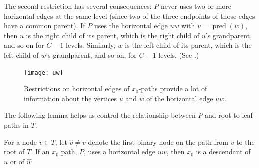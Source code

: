 \documentclass{patmorin}
\DeclareMathOperator{\pred}{pred}
\begin{document}
The second restriction has several consequences: $P$ never uses two or
more horizontal edges at the same level (since two of the three endpoints
of those edges have a common parent).  If $P$ uses the horizontal edge
$uw$ with $u=\pred(w)$, then $u$ is the right child of its parent, which
is the right child of $u$'s grandparent, and so on for $C-1$ levels.
Similarly, $w$ is the left child of its parent, which is the left child
of $w$'s grandparent, and so on, for $C-1$ levels. (See .)

\begin{figure}
  \begin{center}
    \texttt{[image: uw]}
  \end{center}
  \caption{Restrictions on horizontal edges of $x_0$-paths provide a
  lot of information about the vertices $u$ and $w$ of the horizontal
  edge $uw$.} 
\end{figure}

The following lemma helps us control the relationship between $P$ and
root-to-leaf paths in $T$.

\begin{lem}
  For a node $v\in T$, let $\hat v\neq v$ denote the first binary node on
  the path from $v$ to the root of $T$.  If an $x_0$ path, $P$,
  uses a horizontal edge $uw$, then $x_0$ is a descendant of $\hat u$
  or of $\hat w$
\end{lem}
\end{document}
